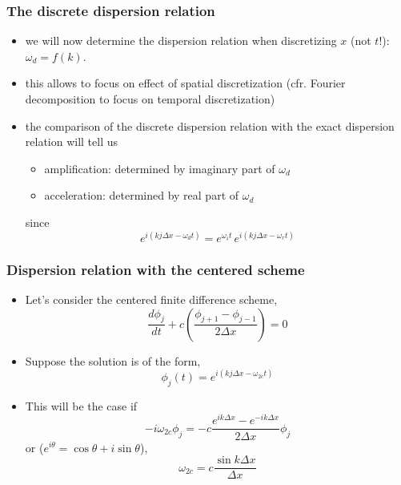 \documentclass[aspectratio=43,9pt]{beamer}
\begin{document}
\begin{frame}
	\frametitle{The discrete dispersion relation}
	\vfill\begin{itemize}
		\item we will now determine the dispersion relation when discretizing $x$ (not $t$!): $\omega_d=f(k)$.\vfill
		\item this allows to focus on effect of spatial discretization (cfr. Fourier decomposition to focus on temporal discretization)\vfill
		\item the comparison of the discrete dispersion relation with the exact dispersion relation will tell us\vfill
			\begin{itemize}
				\item amplification: determined by imaginary part of $\omega_d$\vfill
				\item acceleration: determined by real part of $\omega_d$\vfill
			\end{itemize}
			since
			\begin{equation*}
				e^{i\left(k j \Delta x-\omega_d t\right)}=e^{\omega_i t}\,e^{i\left(kj\Delta x-\omega_r t\right)}
			\end{equation*}
	\end{itemize}\vfill
\end{frame}
%
%
\begin{frame}
	\frametitle{Dispersion relation with the centered scheme}
	\vfill\begin{itemize}
		\item Let's consider the centered finite difference scheme,
			\begin{equation*}
				\frac{ d \phi_j}{dt} + c 
				\left(
					\frac{\phi_{j+1} - \phi_{j-1}}{2 \Delta x}
				\right)
				= 0
			\end{equation*}\vfill
		\item Suppose the solution is of the form,
			\begin{equation*}
				\phi_j (t) = e^{i \left( k j \Delta x - \omega_{2c} t \right)}
			\end{equation*}\vfill
		\item This will be the case if
			\begin{equation*}
				- i \omega_{2c} \phi_j = - c
				\frac{e^{ik \Delta x} - e^{- i k \Delta x}}{2 \Delta x} \phi_j
			\end{equation*}
			or ($e^{i\theta}=\cos\theta+i\sin\theta$),
			\begin{equation*}
				\omega_{2c} = c \frac{\sin k \Delta x}{\Delta x}
			\end{equation*}
	\end{itemize}\vfill
\end{frame}
\end{document}
